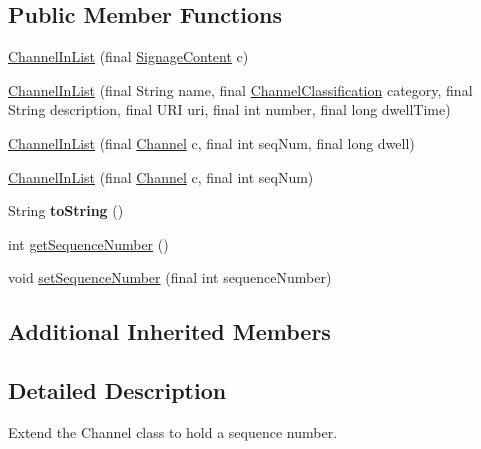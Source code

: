 \subsection*{Public Member Functions}
\begin{DoxyCompactItemize}
\item 
\hyperlink{classgov_1_1fnal_1_1ppd_1_1dd_1_1channel_1_1ChannelInList_a400379d26979426b04461bd0909d26ca}{Channel\-In\-List} (final \hyperlink{interfacegov_1_1fnal_1_1ppd_1_1dd_1_1signage_1_1SignageContent}{Signage\-Content} c)
\item 
\hyperlink{classgov_1_1fnal_1_1ppd_1_1dd_1_1channel_1_1ChannelInList_aa62eabd5ac9715d5a95ade9fbb07062c}{Channel\-In\-List} (final String name, final \hyperlink{classgov_1_1fnal_1_1ppd_1_1dd_1_1changer_1_1ChannelClassification}{Channel\-Classification} category, final String description, final U\-R\-I uri, final int number, final long dwell\-Time)
\item 
\hyperlink{classgov_1_1fnal_1_1ppd_1_1dd_1_1channel_1_1ChannelInList_a3b2d4b3a713237d50a4d6c625b284de1}{Channel\-In\-List} (final \hyperlink{interfacegov_1_1fnal_1_1ppd_1_1dd_1_1signage_1_1Channel}{Channel} c, final int seq\-Num, final long dwell)
\item 
\hyperlink{classgov_1_1fnal_1_1ppd_1_1dd_1_1channel_1_1ChannelInList_a403246d41b3c9f9bef16cfa4c9ca6e96}{Channel\-In\-List} (final \hyperlink{interfacegov_1_1fnal_1_1ppd_1_1dd_1_1signage_1_1Channel}{Channel} c, final int seq\-Num)
\item 
\hypertarget{classgov_1_1fnal_1_1ppd_1_1dd_1_1channel_1_1ChannelInList_a4fced725b7768aea98ae85549c937388}{String {\bfseries to\-String} ()}\label{classgov_1_1fnal_1_1ppd_1_1dd_1_1channel_1_1ChannelInList_a4fced725b7768aea98ae85549c937388}

\item 
int \hyperlink{classgov_1_1fnal_1_1ppd_1_1dd_1_1channel_1_1ChannelInList_a73b9620309ba3f2e8cd7142e9f107227}{get\-Sequence\-Number} ()
\item 
void \hyperlink{classgov_1_1fnal_1_1ppd_1_1dd_1_1channel_1_1ChannelInList_a248382f22bfd71369082af07784e0fff}{set\-Sequence\-Number} (final int sequence\-Number)
\end{DoxyCompactItemize}
\subsection*{Additional Inherited Members}


\subsection{Detailed Description}
Extend the Channel class to hold a sequence number.

